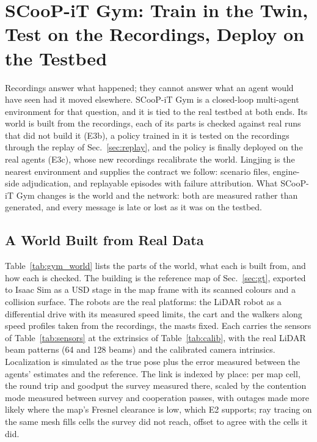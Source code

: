 \section{SCooP-iT Gym: Train in the Twin, Test on the Recordings, Deploy on the Testbed}
\label{sec:gym}
Recordings answer what happened; they cannot answer what an agent
would have seen had it moved elsewhere. SCooP-iT Gym is a closed-loop
multi-agent environment for that question, and it is tied to the real
testbed at both ends. Its world is built from the recordings, each of
its parts is checked against real runs that did not build it (E3b), a
policy trained in it is tested on the recordings through the replay of
Sec.~\ref{sec:replay}, and the policy is finally deployed on the real
agents (E3c), whose new recordings recalibrate the world. Lingjing
\cite{lingjing} is the nearest environment and supplies the contract we
follow: scenario files, engine-side adjudication, and replayable
episodes with failure attribution. What SCooP-iT Gym changes is the
world and the network: both are measured rather than generated, and
every message is late or lost as it was on the testbed.

\subsection{A World Built from Real Data}
Table~\ref{tab:gym_world} lists the parts of the world, what each is
built from, and how each is checked. The building is the reference map
of Sec.~\ref{sec:gt}, exported to Isaac Sim \cite{isaacsim} as a USD
stage in the map frame with its scanned colours and a collision
surface. The robots are the real platforms: the LiDAR robot as a
differential drive with its measured speed limits, the cart and the
walkers along speed profiles taken from the recordings, the masts
fixed. Each carries the sensors of Table~\ref{tab:sensors} at the
extrinsics of Table~\ref{tab:calib}, with the real LiDAR beam patterns
(64 and 128 beams) and the calibrated camera intrinsics. Localization
is simulated as the true pose plus the error measured between the
agents' estimates and the reference. The link is indexed by place:
per map cell, the round trip and goodput the survey measured there,
scaled by the contention mode measured between survey and cooperation
passes, with outages made more likely where the map's Fresnel clearance
is low, which E2 supports; ray tracing on the same mesh
\cite{hoydis2023sionnart} fills cells the survey did not reach, offset
to agree with the cells it did.

